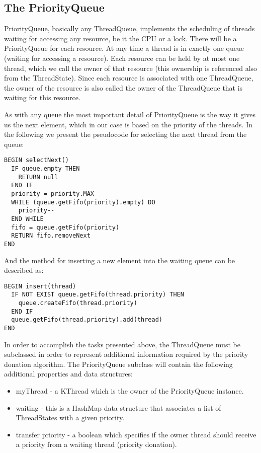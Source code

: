 \documentclass[a4paper,10pt]{article}
\begin{document}
\subsection{The PriorityQueue}

PriorityQueue, basically any ThreadQueue, implements the scheduling of threads waiting for accessing any resource, be it the CPU or a lock. There will be a PriorityQueue for each resource. At any time a thread is in exactly one queue (waiting for accessing a resource). Each resource can be held by at most one thread, which we call the owner of that resource (this ownership is referenced also from the ThreadState). Since each resource is associated with one ThreadQueue, the owner of the resource is also called the owner of the ThreadQueue that is waiting for this resource.

As with any queue the most important detail of PriorityQueue is the way it gives us the next element, which in our case is based on the priority of the threads. In the following we present the pseudocode for selecting the next thread from the queue:
\begin{verbatim}
BEGIN selectNext()
  IF queue.empty THEN 
    RETURN null 
  END IF
  priority = priority.MAX
  WHILE (queue.getFifo(priority).empty) DO
    priority--
  END WHILE
  fifo = queue.getFifo(priority)
  RETURN fifo.removeNext
END
\end{verbatim}

And the method for inserting a new element into the waiting queue can be described as:
\begin{verbatim}
BEGIN insert(thread)
  IF NOT EXIST queue.getFifo(thread.priority) THEN 
    queue.createFifo(thread.priority) 
  END IF
  queue.getFifo(thread.priority).add(thread)
END
\end{verbatim}

In order to accomplish the tasks presented above, the ThreadQueue must be subclassed in order to represent additional information required by the priority donation algorithm. The PriorityQueue subclass will contain the following additional properties and data structures:
\begin{itemize}
\item myThread - a KThread which is the owner of the PriorityQueue instance.
\item waiting - this is a HashMap data structure that associates a list of ThreadStates with a given priority.
\item transfer priority - a boolean which specifies if the owner thread should receive a priority from a waiting thread (priority donation).
\end{itemize}
\end{document}
